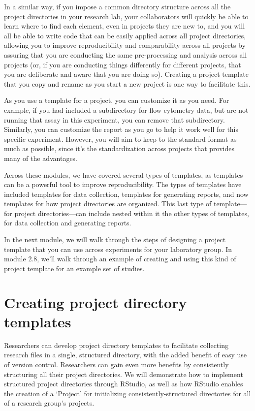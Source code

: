 \documentclass[]{tufte-book}
\begin{document}
In a similar way, if you impose a common directory structure across all the
project directories in your research lab, your collaborators will quickly be
able to learn where to find each element, even in projects they are new to, and
you will all be able to write code that can be easily applied across all project
directories, allowing you to improve reproducibility and comparability across
all projects by assuring that you are conducting the same pre-processing and
analysis across all projects (or, if you are conducting things differently for
different projects, that you are deliberate and aware that you are doing so).
Creating a project template that you copy and rename as you start a new
project is one way to facilitate this.

As you use a template for a project, you can customize it as you need. For
example, if you had included a subdirectory for flow cytometry data, but are not
running that assay in this experiment, you can remove that subdirectory.
Similarly, you can customize the report as you go to help it work well for this
specific experiment. However, you will aim to keep to the standard format as
much as possible, since it's the standardization across projects that provides
many of the advantages.

Across these modules, we have covered several types of templates, as templates
can be a powerful tool to improve reproducibility. The types of templates have
included templates for data collection, templates for generating reports, and
now templates for how project directories are organized. This last type of template---
for project directories---can include nested within it the other types of
templates, for data collection and generating reports.

In the next module, we will walk through the steps of designing a project
template that you can use across experiments for your laboratory group. In
module 2.8, we'll walk through an example of creating and using this kind of
project template for an example set of studies.

\section{Creating project directory templates}\label{module7}

Researchers can develop project directory templates to facilitate collecting research
files in a single, structured directory, with the added benefit of easy use of
version control. Researchers can gain even more benefits by consistently
structuring all their project directories. We will demonstrate how to
implement structured project directories through RStudio, as well as how RStudio
enables the creation of a `Project' for initializing consistently-structured
directories for all of a research group's projects.
\end{document}
